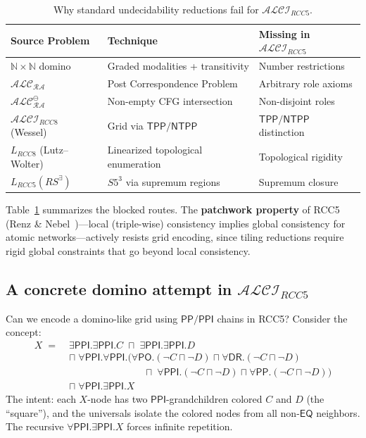 \documentclass[
]{ceurart}
\theoremstyle{definition}
\newcommand{\ALC}{\ensuremath{\mathcal{ALC}}}
\newcommand{\ALCIRCC}[1]{\ensuremath{\mathcal{ALCI}_{\mathit{RCC#1}}}}
\newcommand{\LRCC}[1]{\ensuremath{L_{\mathit{RCC#1}}}}
\newcommand{\DR}{\ensuremath{\mathsf{DR}}}
\newcommand{\PO}{\ensuremath{\mathsf{PO}}}
\newcommand{\EQ}{\ensuremath{\mathsf{EQ}}}
\newcommand{\PP}{\ensuremath{\mathsf{PP}}}
\newcommand{\PPI}{\ensuremath{\mathsf{PPI}}}
\newcommand{\TPP}{\ensuremath{\mathsf{TPP}}}
\newcommand{\NTPP}{\ensuremath{\mathsf{NTPP}}}
\newcommand{\naturals}{\mathbb{N}}
\begin{document}
\begin{table}[t]
\caption{Why standard undecidability reductions fail for $\ALCIRCC{5}$.}
\label{tab:blocked}
\begin{tabular}{p{3.0cm}p{3.8cm}p{3.5cm}}
\toprule
\textbf{Source Problem} & \textbf{Technique} & \textbf{Missing in $\ALCIRCC{5}$} \\
\midrule
$\naturals \times \naturals$ domino & Graded modalities + transitivity & Number restrictions \\
$\ALC_{\mathcal{RA}}$ \cite{Wessel2001RA} & Post Correspondence Problem & Arbitrary role axioms \\
$\ALC_{\mathcal{RA}}^\ominus$ \cite{Wessel2000RA} & Non-empty CFG intersection & Non-disjoint roles \\
$\ALCIRCC{8}$ (Wessel) & Grid via $\TPP/\NTPP$ & $\TPP/\NTPP$ distinction \\
$\LRCC{8}$ (Lutz--Wolter) & Linearized topological enumeration & Topological rigidity \\
$\LRCC{5}(\mathit{RS}^\exists)$ & $S5^3$ via supremum regions & Supremum closure \\
\bottomrule
\end{tabular}
\end{table}

Table~\ref{tab:blocked} summarizes the blocked routes.
The \textbf{patchwork property} of RCC5 (Renz \& Nebel~\cite{RenzNebel1999})---local
(triple-wise) consistency implies global consistency for atomic
networks---actively resists grid encoding, since tiling reductions
require rigid global constraints that go beyond local consistency.

\subsection{A concrete domino attempt in $\ALCIRCC{5}$}
\label{sec:domino-attempt}

Can we encode a domino-like grid using $\PP/\PPI$ chains in RCC5?
Consider the concept:
\begin{align*}
  X \;=\; &\exists\PPI.\exists\PPI.C \;\sqcap\; \exists\PPI.\exists\PPI.D \\
  &\sqcap\; \forall\PPI.\forall\PPI.(\forall\PO.(\neg C \sqcap \neg D)
    \sqcap \forall\DR.(\neg C \sqcap \neg D) \\
  &\qquad\qquad\qquad\quad\;\;
    \sqcap\; \forall\PPI.(\neg C \sqcap \neg D)
    \sqcap \forall\PP.(\neg C \sqcap \neg D)) \\
  &\sqcap\; \forall\PPI.\exists\PPI.X
\end{align*}
The intent: each $X$-node has two $\PPI$-grandchildren colored $C$
and $D$ (the ``square''), and the universals isolate the colored
nodes from all non-$\EQ$ neighbors.  The recursive
$\forall\PPI.\exists\PPI.X$ forces infinite repetition.
\end{document}
